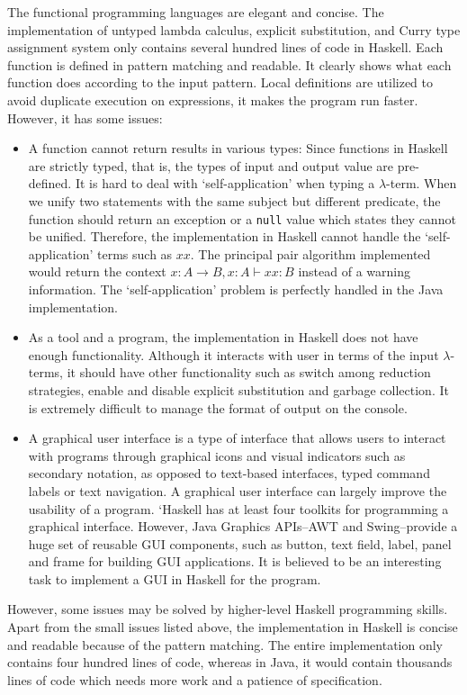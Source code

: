 The functional programming languages are elegant and concise. The implementation of untyped lambda calculus, explicit substitution, and Curry type assignment system only contains several hundred lines of code in Haskell. Each function is defined in pattern matching and readable. It clearly shows what each function does according to the input pattern. Local definitions are utilized to avoid duplicate execution on expressions, it makes the program run faster. However, it has some issues: 
\begin{itemize}
\item A function cannot return results in various types: Since functions in Haskell are  strictly typed, that is, the types of input and output value are pre-defined. It is hard to deal with `self-application' when typing a $\lambda$-term. When we unify two statements with the same subject but different predicate, the function should return an exception or a \texttt{null} value which states they cannot be unified. Therefore, the implementation in Haskell cannot handle the `self-application' terms such as $xx$. The principal pair algorithm implemented would return the context $x:A\rightarrow B, x:A \vdash xx:B$ instead of a warning information. The `self-application' problem is perfectly handled in the Java implementation.  

\item As a tool and a program, the implementation in Haskell does not have enough functionality. Although it interacts with user in terms of the input $\lambda$-terms, it should have other functionality such as switch among reduction strategies, enable and disable explicit substitution and garbage collection. It is extremely difficult to manage the format of output on the console. 

\item A graphical user interface is a type of interface that allows users to interact with programs through graphical icons and visual indicators such as secondary notation, as opposed to text-based interfaces, typed command labels or text navigation. A graphical user interface can largely improve the usability of a program. `Haskell has at least four toolkits for programming a graphical interface. However, Java Graphics APIs--AWT and Swing--provide a huge set of reusable GUI components, such as button, text field, label, panel and frame for building GUI applications. It is believed to be an interesting task to implement a GUI in Haskell for the program. 

\end{itemize}

However, some issues may be solved by higher-level Haskell programming skills. Apart from the small issues listed above, the implementation in Haskell is concise and readable because of the pattern matching. The entire implementation only contains four hundred lines of code, whereas in Java, it would contain thousands lines of code which needs more work and a patience of specification.   








   


